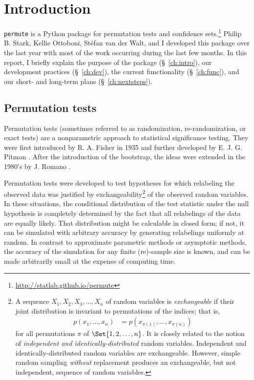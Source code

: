 \chapter{\label{ch:intro}Introduction}

\texttt{permute} is a Python package for permutation tests and confidence
sets.\footnote{\url{http://statlab.github.io/permute}} Philip B. Stark, Kellie
Ottoboni, St\'{e}fan van der Walt, and I developed this package over the last
year with most of the work occurring during the last few months.  In this
report, I briefly explain the purpose of the package (\S~\ref{ch:intro}), our
development practices (\S~\ref{ch:dev}), the current functionality
(\S~\ref{ch:func}), and our short- and long-term plans (\S~\ref{ch:nextsteps}).

\section{Permutation tests}

Permutation tests (sometimes referred to as randomization, re-randomization, or
exact tests) are a nonparametric approach to statistical significance testing.
They were first introduced by R. A. Fisher in 1935 \cite{fisher1935design} and
further developed by E. J. G. Pitman  \cite{pitman1937,
pitman1938significance}.  After the introduction of the bootstrap, the ideas
were extended in the 1980's by J. Romano \cite{romano1988bootstrap,
romano1989bootstrap}.

Permutation tests were developed to test hypotheses for which relabeling the
observed data was justified by 
exchangeability\footnote{A sequence $X_1, X_2, X_3, \dots, X_n$ of random
variables is \emph{exchangeable} if their joint distribution is invariant to
permutations of the indices; that is,
\begin{align*}
p(x_1, \dots, x_n) &= p(x_{\pi(1)}, \dots, x_{\pi(n)})
\end{align*}
for all permutations $\pi$ of $\Set{1, 2, \dots, n}$.  It is closely related to the
notion of \emph{independent and identically-distributed} random variables.
Independent and identically-distributed random variables are exchangeable.
However, simple random sampling \emph{without} replacement produces an
exchangeable, but not independent, sequence of random variables.}
of the observed random variables.  In these situations, the
conditional distribution of the test statistic under the null hypothesis is completely
determined by the fact that all relabelings of the data are equally likely.
That distribution might be calculable in closed form; if not, it can be simulated
with arbitrary accuracy by generating relabelings uniformly at random.
In contrast to approximate parametric methods or asymptotic methods, the accuracy
of the simulation for any finite (re)-sample size is known, and can be made
arbitrarily small at the expense of computing time.


